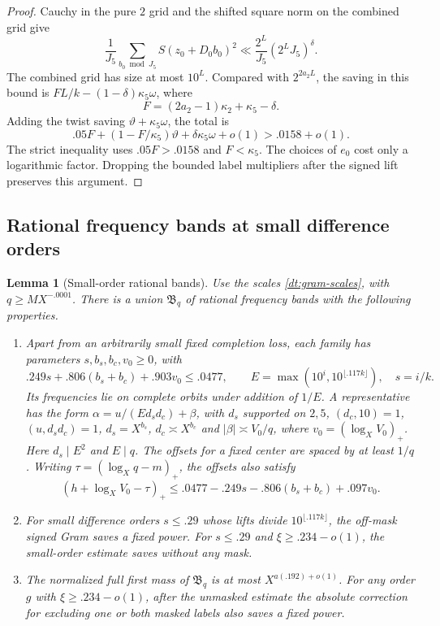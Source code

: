 \documentclass[11pt,a4paper]{article}
\theoremstyle{paperplain}
\newtheorem{lemma}[theorem]{Lemma}
\numberwithin{equation}{section}
\begin{document}
\begin{proof}
Cauchy in the pure \(2\) grid and the shifted square norm
on the combined grid give
\[
 \frac1{J_5}\sum_{b_0\bmod J_5}S(z_0+D_0 b_0)^2
       \ll \frac{2^L}{J_5}(2^L J_5)^\delta .
\]
The combined grid has size at most \(10^L\).
Compared with \(2^{2a_2 L}\), the saving in this bound is
\(F L/k-(1-\delta)\kappa_5\omega\), where
\[
 F=(2a_2-1)\kappa_2+\kappa_5-\delta.
\]
Adding the twist saving \(\vartheta+\kappa_5\omega\),
the total is
\[
 .05 F+(1-F/\kappa_5)\vartheta+\delta\kappa_5\omega+o(1)
                         >.0158+o(1).
\]
The strict inequality uses \(.05F>.0158\) and \(F<\kappa_5\).
The choices of \(e_0\) cost only a logarithmic factor.
Dropping the bounded label multipliers after the signed lift
preserves this argument.
\end{proof}

\subsection{Rational frequency bands at small difference orders}

\begin{lemma}[Small-order rational bands]\label{dt:gram-mask}
Use the scales \eqref{dt:gram-scales}, with \(q\ge MX^{-.0001}\).
There is a union \(\mathfrak B_q\) of rational frequency
bands with the following properties.

\begin{enumerate}
\item Apart from an arbitrarily small fixed completion loss,
each family has parameters \(s,b_s,b_c,v_0\ge0\), with
\begin{equation}
 .249s+.806(b_s+b_c)+.903v_0\le .0477,\qquad
 E=\max(10^i,10^{\lfloor .117 k\rfloor}),\quad s=i/k.
 \label{dt:gram-mask-budget}
\end{equation}
Its frequencies lie on complete orbits under addition of
\(1/E\). A representative has the form
\(\alpha=u/(E d_s d_c)+\beta\), with \(d_s\) supported on
\(2,5\), \((d_c,10)=1\), \((u,d_s d_c)=1\),
\(d_s=X^{b_s}\), \(d_c\asymp X^{b_c}\) and
\(|\beta|\asymp V_0/q\), where \(v_0=(\log_X V_0)_+\).
Here \(d_s\mid E^2\) and \(E\mid q\). The offsets for a
fixed center are spaced by at least \(1/q\).
Writing \(\tau=(\log_Xq-m)_+\), the offsets also satisfy
\begin{equation}
 (h+\log_X V_0-\tau)_+
              \le .0477-.249s-.806(b_s+b_c)+.097v_0.
 \label{dt:gram-mask-offset}
\end{equation}

\item For small difference orders \(s\le.29\) whose lifts
divide \(10^{\lfloor.117k\rfloor}\), the off-mask signed
Gram saves a fixed power. For \(s\le.29\) and
\(\xi\ge.234-o(1)\), the small-order estimate saves without
any mask.

\item The normalized full first mass of \(\mathfrak B_q\)
is at most \(X^{a(.192)+o(1)}\). For any order \(g\) with
\(\xi\ge.234-o(1)\), after the unmasked estimate the absolute
correction for excluding one or both masked labels also
saves a fixed power.
\end{enumerate}
\end{lemma}
\end{document}
